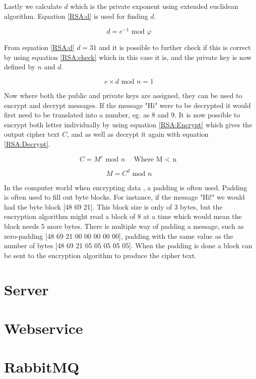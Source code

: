Lastly we calculate $d$ which is the private exponent using extended euclidean algorithm. Equation \ref{RSA:d} is used for finding $d$.

\begin{equation}
d = e^{-1} \textrm{ mod } \varphi
\label{RSA:d}
\end{equation}

From equation \ref{RSA:d} $d=31$ and it is possible to further check if this is correct by using equation \ref{RSA:check} which in this case it is, and the private key is now defined by $n$ and $d$.

\begin{equation}
e \times d \textrm{ mod } n = 1
\label{RSA:check}
\end{equation}

Now where both the public and private keys are assigned, they can be used to encrypt and decrypt messages. If the message "Hi" were to be decrypted it would first need to be translated into a number, eg. as 8 and 9. It is now possible to encrypt both letter individually by using equation \ref{RSA:Encrypt} which gives the output cipher text $C$, and as well as decrypt it again with equation \ref{RSA:Decrypt}.

\begin{equation}
C=M^e \textrm{ mod } n \quad \textrm{Where M $<$ n}
\label{RSA:Encrypt}
\end{equation}

\begin{equation}
M=C^d \textrm{ mod } n
\label{RSA:Decrypt}
\end{equation}

In the computer world when encrypting data , a padding is often used. Padding is often used to fill out byte blocks. For instance, if the message "Hi!" we would had the byte block [48 69 21]. This block size is only of 3 bytes, but the encryption algorithm might read a block of 8 at a time which would mean the block needs 5 more bytes. There is multiple way of padding a message, such as zero-padding [48 69 21 00 00 00 00 00], padding with the same value as the number of bytes [48 69 21 05 05 05 05 05]\cite{PADDING}. When the padding is done a block can be sent to the encryption algorithm to produce the cipher text.

\section{Server}

\section{Webservice}

\section{RabbitMQ}